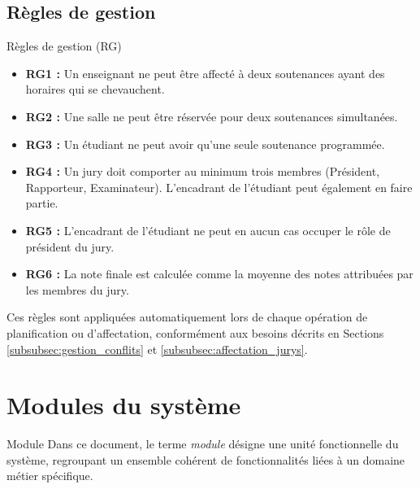 \documentclass[12pt,a4paper]{article}
\begin{document}
\subsection{Règles de gestion}
\label{subsec:regles}

\begin{projectbox}{Règles de gestion (RG)}
    \begin{itemize}[label=\textcolor{primary}{\textbullet}, leftmargin=1.5cm]
        \item \textbf{RG1 :} Un enseignant ne peut être affecté à deux
              soutenances ayant des horaires qui se chevauchent.
        \item \textbf{RG2 :} Une salle ne peut être réservée pour deux
              soutenances simultanées.
        \item \textbf{RG3 :} Un étudiant ne peut avoir qu'une seule soutenance
              programmée.
        \item \textbf{RG4 :} Un jury doit comporter au minimum trois membres (Président,
              Rapporteur, Examinateur). L'encadrant de l'étudiant peut également en
              faire partie.
        \item \textbf{RG5 :} L'encadrant de l'étudiant ne peut en aucun cas occuper
              le rôle de président du jury.
        \item \textbf{RG6 :} La note finale est calculée comme la moyenne des
              notes attribuées par les membres du jury.
    \end{itemize}
\end{projectbox}

Ces règles sont appliquées automatiquement lors de chaque opération de
planification ou d'affectation, conformément aux besoins décrits en Sections
\ref{subsubsec:gestion_conflits} et \ref{subsubsec:affectation_jurys}.

\section{Modules du système}

\begin{projectbox}{Module}
    Dans ce document, le terme \textit{module} désigne une unité fonctionnelle du système,
    regroupant un ensemble cohérent de fonctionnalités liées à un domaine métier spécifique.
\end{projectbox}
\end{document}
